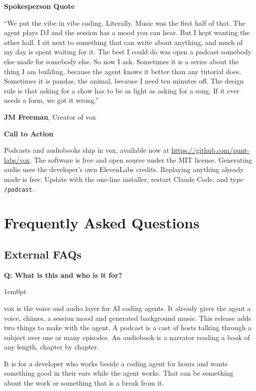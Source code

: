 \documentclass[11pt,letterpaper]{article} %
\newcommand{\prsection}[1]{%
  \vspace{1em}%
  {\large\bfseries\color{SectionBlue}#1}%
  \vspace{0.3em}\par%
}
\newcounter{faqnum} %
\newenvironment{faqpair}[1]{%
  \needspace{4\baselineskip}%
  \vspace{0.5em}%
  \refstepcounter{faqnum}%
  \noindent\textbf{\color{SectionBlue}Q\thefaqnum: #1}\par\nopagebreak[4]%
  \vspace{0.2em}%
  \begin{adjustwidth}{1em}{0pt}%
  \setlength{\parindent}{0pt}%
  \setlength{\parskip}{0.5em}%
}{%
  \end{adjustwidth}%
  \vspace{0.5em}%
}
\begin{document}
\prsection{Spokesperson Quote}

\begin{spokespersonquote}
``We put the vibe in vibe coding. Literally. Music was the first half of
that. The agent plays DJ and the session has a mood you can hear. But I
kept wanting the other half. I sit next to something that can write about
anything, and much of my day is spent waiting for it. The best I could do
was open a podcast somebody else made for somebody else. So now I ask.
Sometimes it is a series about the thing I am building, because the agent
knows it better than any tutorial does. Sometimes it is pandas, the animal,
because I need ten minutes off. The design rule is that asking for a show
has to be as light as asking for a song. If it ever needs a form, we got it
wrong.''

\raggedleft \textbf{JM Freeman}, Creator of vox
\end{spokespersonquote}

\prsection{Call to Action}

Podcasts and audiobooks ship in vox, available now at
\url{https://github.com/punt-labs/vox}. The software is free and open
source under the MIT license. Generating audio uses the developer's own
ElevenLabs credits. Replaying anything already made is free. Update with
the one-line installer, restart Claude Code, and type \texttt{/podcast}.

\newpage


\section*{Frequently Asked Questions}

\subsection*{External FAQs}

\begin{faqpair}{What is this and who is it for?}\label{faq:what}

  vox is the voice and audio layer for AI coding agents. It already gives
  the agent a voice, chimes, a session mood and generated background music.
  This release adds two things to make with the agent. A podcast is a cast
  of hosts talking through a subject over one or many episodes. An
  audiobook is a narrator reading a book of any length, chapter by chapter.

  It is for a developer who works beside a coding agent for hours and wants
  something good in their ears while the agent works. That can be something
  about the work or something that is a break from it.
\end{faqpair}
\end{document}
